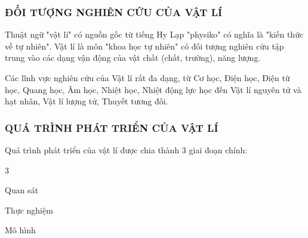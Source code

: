 \subsubsection{ĐỐI TƯỢNG NGHIÊN CỨU CỦA VẬT LÍ}
\par Thuật ngữ "vật lí" có nguồn gốc từ tiếng Hy Lạp "physiko" có nghĩa là "kiến thức về tự nhiên". Vật lí là môn "khoa học tự nhiên" có đối tượng nghiên cứu tập trung vào các dạng vận động của vật chất (chất, trường), năng lượng.
\par Các lĩnh vực nghiên cứu của Vật lí rất đa dạng, từ Cơ học, Điện học, Điện từ học, Quang học, Âm học, Nhiệt học, Nhiệt động lực học đến Vật lí nguyên tử và hạt nhân, Vật lí lượng tử, Thuyết tương đối.
\subsubsection{QUÁ TRÌNH PHÁT TRIỂN CỦA VẬT LÍ}
\noindent Quá trình phát triển của vật lí được chia thành 3 giai đoạn chính:
\begin{enumEX}[\faEdit]{3}
\item Quan sát
\item Thực nghiệm
\item Mô hình
\end{enumEX}
